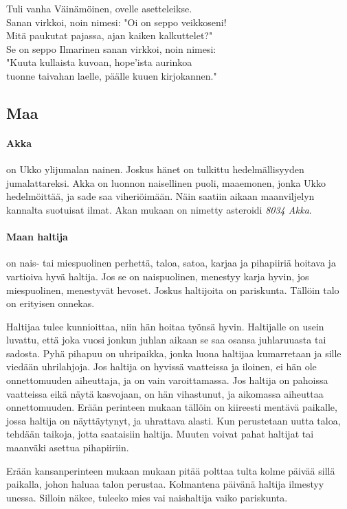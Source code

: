   \begin{center}\begin{em}
    Tuli vanha Väinämöinen, ovelle asetteleikse.\\
    Sanan virkkoi, noin nimesi: "Oi on seppo veikkoseni!\\
    Mitä paukutat pajassa, ajan kaiken kalkuttelet?"\\
    Se on seppo Ilmarinen sanan virkkoi, noin nimesi:\\
    "Kuuta kullaista kuvoan, hope'ista aurinkoa\\
    tuonne taivahan laelle, päälle kuuen kirjokannen."\\
  \end{em}\end{center}


\subsection{Maa}

  \paragraph{Akka} on Ukko ylijumalan nainen. Joskus hänet on tulkittu hedelmällisyyden jumalattareksi.
    Akka on luonnon naisellinen puoli, maaemonen, jonka Ukko hedelmöittää, ja sade saa viheriöimään.
    Näin saatiin aikaan maanviljelyn kannalta suotuisat ilmat. Akan mukaan on nimetty asteroidi \emph{8034 Akka}.
  \paragraph{Maan haltija} on nais- tai miespuolinen perhettä, taloa, satoa, karjaa ja pihapiiriä hoitava ja vartioiva 
    hyvä haltija. Jos se on naispuolinen, menestyy karja hyvin, jos 
    miespuolinen, menestyvät hevoset. Joskus haltijoita on pariskunta. Tällöin talo on erityisen 
    onnekas. \par Haltijaa tulee kunnioittaa, niin hän hoitaa työnsä hyvin. Haltijalle on usein 
    luvattu, että joka vuosi jonkun juhlan aikaan se saa osansa juhlaruuasta tai sadosta. Pyhä 
    pihapuu on uhripaikka, jonka luona haltijaa kumarretaan ja sille viedään uhrilahjoja. Jos 
    haltija on hyvissä vaatteissa ja iloinen, ei hän ole onnettomuuden aiheuttaja, ja on vain 
    varoittamassa. Jos haltija on pahoissa vaatteissa eikä näytä kasvojaan, on hän vihastunut, ja 
    aikomassa aiheuttaa onnettomuuden. Erään perinteen mukaan tällöin on kiireesti mentävä 
    paikalle, jossa haltija on näyttäytynyt, ja uhrattava alasti. Kun perustetaan uutta taloa, 
    tehdään taikoja, jotta saataisiin haltija. Muuten voivat pahat haltijat tai maanväki asettua 
    pihapiiriin. \par Erään kansanperinteen mukaan mukaan pitää polttaa tulta kolme päivää sillä 
    paikalla, johon haluaa talon perustaa. Kolmantena päivänä haltija ilmestyy unessa. Silloin 
    näkee, tuleeko mies vai naishaltija vaiko pariskunta.  
